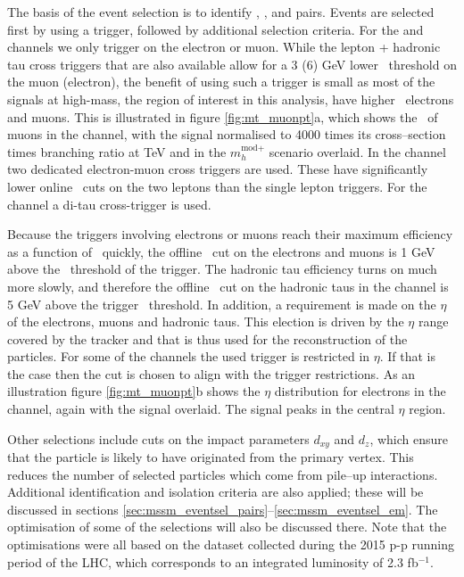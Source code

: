 The basis of the event selection is to identify \mutau, \etau,
\tautau and \emu pairs. Events are selected first by using a trigger,
followed by additional selection criteria. For the \etau
and \mutau channels we only trigger on the electron or muon. 
While the lepton + hadronic tau cross triggers that are also available
allow for a 3 (6) GeV lower \pT~threshold on the
muon (electron), the benefit of using such a trigger is small as 
most of the signals at high-mass, the region of interest in this
analysis, have higher \pT~electrons and muons. This is illustrated
in figure \ref{fig:mt_muonpt}a, which shows the \pT~of muons in the
\mutau channel, with the signal normalised to 4000 times its cross--section
times branching ratio at  TeV and  in the $m_{h}^{\text{mod}+}$ scenario overlaid.
In the \emu channel two dedicated electron-muon cross triggers
are used. These have significantly lower online \pT~cuts 
on the two leptons than the single lepton triggers. For the 
\tautau channel a di-tau cross-trigger is used.

Because the triggers involving electrons or muons reach 
their maximum efficiency as a function of \pT~quickly, the offline \pT~cut
on the electrons and muons is 1 GeV above the \pT~threshold of the trigger. The
hadronic tau efficiency turns on much more slowly, and therefore the offline \pT~cut
on the hadronic taus in the \tautau channel is 5 GeV above the trigger \pT~threshold.
In addition, a requirement is made on the $\eta$ of the electrons, muons and
hadronic taus. This election is driven by the $\eta$ range covered by the tracker and
that is thus used for the reconstruction of the particles. For some of the
channels the used trigger is restricted in $\eta$. If that is the case
then the cut is chosen to align with the trigger restrictions.
As an illustration figure \ref{fig:mt_muonpt}b shows
the $\eta$ distribution for electrons in the \etau channel, again with the signal overlaid.
The signal peaks in the central $\eta$ region.

Other selections include cuts on the impact parameters $d_{xy}$ and $d_{z}$, which
ensure that the particle is likely to have
originated from the primary vertex. This reduces the number of selected particles
which come from pile--up interactions.
Additional identification and isolation criteria
are also applied; these will be discussed in sections \ref{sec:mssm_eventsel_pairs}--\ref{sec:mssm_eventsel_em}.
The optimisation of some of the selections will also be discussed there. Note that 
the optimisations were all based on the dataset collected during the 2015 p-p running period of the \ac{LHC}, which
corresponds to an integrated luminosity of 2.3 fb$^{-1}$. 

